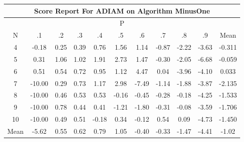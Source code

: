 \documentclass[11pt,a4paper]{report}
\begin{document}
\begin{longtable}{ | c || c | c | c | c | c | c | c | c | c || c |}
\hline
\multicolumn{11}{|c|}{ Score Report For ADIAM on Algorithm MinusOne} \\
\hline
\multicolumn{11}{|c|}{ P } \\
\hline
N & .1 & .2 & .3 & .4 & .5 & .6 & .7 & .8 & .9 & Mean\\
 \hline
 \hline
 \endhead
  4 &  \cellcolor[HTML]{FFFFFF} -0.18 &  \cellcolor[HTML]{F7F7FF} 0.25 &  \cellcolor[HTML]{EFEFFF} 0.39 &  \cellcolor[HTML]{E7E7FF} 0.76 &  \cellcolor[HTML]{CFCFFF} 1.56 &  \cellcolor[HTML]{DFDFFF} 1.14 &  \cellcolor[HTML]{FFEFEF} -0.87 &  \cellcolor[HTML]{FFC7C7} -2.22 &  \cellcolor[HTML]{FFA7A7} -3.63 & -0.311 \\
  5 &  \cellcolor[HTML]{F7F7FF} 0.31 &  \cellcolor[HTML]{DFDFFF} 1.06 &  \cellcolor[HTML]{DFDFFF} 1.02 &  \cellcolor[HTML]{C7C7FF} 1.91 &  \cellcolor[HTML]{B7B7FF} 2.73 &  \cellcolor[HTML]{D7D7FF} 1.47 &  \cellcolor[HTML]{FFFFFF} -0.30 &  \cellcolor[HTML]{FFCFCF} -2.05 &  \cellcolor[HTML]{FF5858} -6.68 & -0.059 \\
  6 &  \cellcolor[HTML]{EFEFFF} 0.51 &  \cellcolor[HTML]{EFEFFF} 0.54 &  \cellcolor[HTML]{E7E7FF} 0.72 &  \cellcolor[HTML]{DFDFFF} 0.95 &  \cellcolor[HTML]{DFDFFF} 1.12 &  \cellcolor[HTML]{8787FF} 4.47 &  \cellcolor[HTML]{F7F7FF} 0.04 &  \cellcolor[HTML]{FF9F9F} -3.96 &  \cellcolor[HTML]{FF9797} -4.10 & 0.033 \\
  7 &  \cellcolor[HTML]{FF0808} -10.00 &  \cellcolor[HTML]{F7F7FF} 0.29 &  \cellcolor[HTML]{E7E7FF} 0.73 &  \cellcolor[HTML]{DFDFFF} 1.17 &  \cellcolor[HTML]{AFAFFF} 2.98 &  \cellcolor[HTML]{FF4848} -7.49 &  \cellcolor[HTML]{FFE7E7} -1.14 &  \cellcolor[HTML]{FFCFCF} -1.88 &  \cellcolor[HTML]{FF9F9F} -3.87 & -2.135 \\
  8 &  \cellcolor[HTML]{FF0808} -10.00 &  \cellcolor[HTML]{EFEFFF} 0.46 &  \cellcolor[HTML]{EFEFFF} 0.53 &  \cellcolor[HTML]{EFEFFF} 0.53 &  \cellcolor[HTML]{FFFFFF} -0.16 &  \cellcolor[HTML]{FFF7F7} -0.45 &  \cellcolor[HTML]{FFFFFF} -0.28 &  \cellcolor[HTML]{FFFFFF} -0.18 &  \cellcolor[HTML]{FF9797} -4.25 & -1.533 \\
  9 &  \cellcolor[HTML]{FF0808} -10.00 &  \cellcolor[HTML]{E7E7FF} 0.78 &  \cellcolor[HTML]{EFEFFF} 0.44 &  \cellcolor[HTML]{EFEFFF} 0.41 &  \cellcolor[HTML]{FFE7E7} -1.21 &  \cellcolor[HTML]{FFD7D7} -1.80 &  \cellcolor[HTML]{FFF7F7} -0.31 &  \cellcolor[HTML]{FFFFFF} -0.08 &  \cellcolor[HTML]{FFA7A7} -3.59 & -1.706 \\
  10 &  \cellcolor[HTML]{FF0808} -10.00 &  \cellcolor[HTML]{EFEFFF} 0.49 &  \cellcolor[HTML]{EFEFFF} 0.51 &  \cellcolor[HTML]{FFFFFF} -0.18 &  \cellcolor[HTML]{EFEFFF} 0.34 &  \cellcolor[HTML]{FFFFFF} -0.12 &  \cellcolor[HTML]{EFEFFF} 0.54 &  \cellcolor[HTML]{F7F7FF} 0.09 &  \cellcolor[HTML]{FF8787} -4.73 & -1.450 \\
 \hline
 \hline
Mean &  \cellcolor[HTML]{FF7878} -5.62 &  \cellcolor[HTML]{EFEFFF} 0.55 &  \cellcolor[HTML]{EFEFFF} 0.62 &  \cellcolor[HTML]{E7E7FF} 0.79 &  \cellcolor[HTML]{DFDFFF} 1.05 &  \cellcolor[HTML]{FFF7F7} -0.40 &  \cellcolor[HTML]{FFF7F7} -0.33 &  \cellcolor[HTML]{FFDFDF} -1.47 &  \cellcolor[HTML]{FF8F8F} -4.41 &  \cellcolor[HTML]{FFE7E7} -1.02
\end{longtable}
\end{document}
